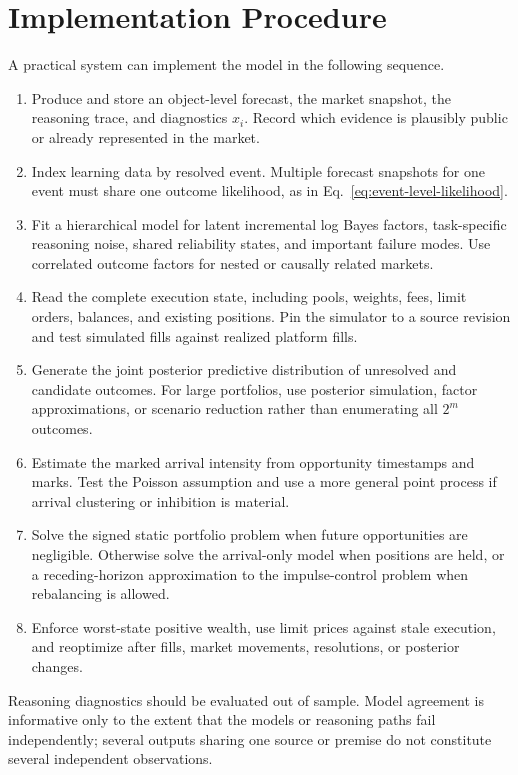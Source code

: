 \documentclass[journal,a4paper]{IEEEtran}
\begin{document}
\section{Implementation Procedure}
A practical system can implement the model in the following sequence.
\begin{enumerate}
\item Produce and store an object-level forecast, the market snapshot, the reasoning trace, and diagnostics $x_i$. Record which evidence is plausibly public or already represented in the market.
\item Index learning data by resolved event. Multiple forecast snapshots for one event must share one outcome likelihood, as in Eq.~\eqref{eq:event-level-likelihood}.
\item Fit a hierarchical model for latent incremental log Bayes factors, task-specific reasoning noise, shared reliability states, and important failure modes. Use correlated outcome factors for nested or causally related markets.
\item Read the complete execution state, including pools, weights, fees, limit orders, balances, and existing positions. Pin the simulator to a source revision and test simulated fills against realized platform fills.
\item Generate the joint posterior predictive distribution of unresolved and candidate outcomes. For large portfolios, use posterior simulation, factor approximations, or scenario reduction rather than enumerating all $2^m$ outcomes.
\item Estimate the marked arrival intensity from opportunity timestamps and marks. Test the Poisson assumption and use a more general point process if arrival clustering or inhibition is material.
\item Solve the signed static portfolio problem when future opportunities are negligible. Otherwise solve the arrival-only model when positions are held, or a receding-horizon approximation to the impulse-control problem when rebalancing is allowed.
\item Enforce worst-state positive wealth, use limit prices against stale execution, and reoptimize after fills, market movements, resolutions, or posterior changes.
\end{enumerate}

Reasoning diagnostics should be evaluated out of sample. Model agreement is informative only to the extent that the models or reasoning paths fail independently; several outputs sharing one source or premise do not constitute several independent observations.
\end{document}
